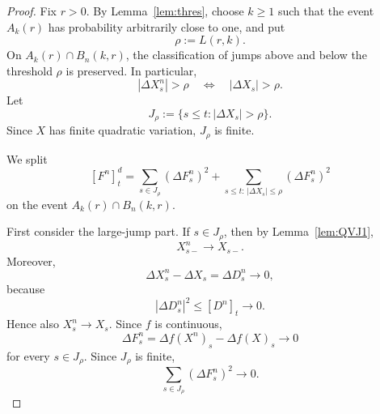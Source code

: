 \documentclass[a4paper,10pt]{article}
\begin{document}
\begin{proof}
Fix \(r>0\). By Lemma~\ref{lem:thres}, choose \(k\ge1\) such that the
event \(A_k(r)\) has probability arbitrarily close to one, and put
\[
        \rho:=L(r,k).
\]
On \(A_k(r)\cap B_n(k,r)\), the classification of jumps above and below
the threshold \(\rho\) is preserved. In particular,
\[
        |\Delta X^n_s|>\rho
        \quad\Longleftrightarrow\quad
        |\Delta X_s|>\rho .
\]
Let
\[
        J_\rho:=\{s\le t:|\Delta X_s|>\rho\}.
\]
Since \(X\) has finite quadratic variation, \(J_\rho\) is finite.

We split
\[
        [F^n]^d_t
        =
        \sum_{s\in J_\rho}(\Delta F^n_s)^2
        +
        \sum_{s\le t:\,|\Delta X_s|\le \rho}(\Delta F^n_s)^2
\]
on the event \(A_k(r)\cap B_n(k,r)\).

First consider the large-jump part. If \(s\in J_\rho\), then by
Lemma~\ref{lem:QVJ1},
\[
        X^n_{s-}\to X_{s-}.
\]
Moreover,
\[
        \Delta X^n_s-\Delta X_s
        =
        \Delta D^n_s\to0,
\]
because
\[
        |\Delta D^n_s|^2\le [D^n]_t\to0.
\]
Hence also \(X^n_s\to X_s\). Since \(f\) is continuous,
\[
        \Delta F^n_s
        =
        \Delta f(X^n)_s-\Delta f(X)_s
        \longrightarrow 0
\]
for every \(s\in J_\rho\). Since \(J_\rho\) is finite,
\[
        \sum_{s\in J_\rho}(\Delta F^n_s)^2\longrightarrow 0.
\]


\end{proof}
\end{document}

